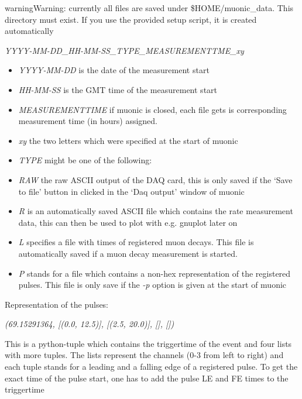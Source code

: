 \documentclass[letterpaper,10pt,english]{sphinxmanual}
\begin{document}
\begin{notice}{warning}{Warning:}
currently all files are saved under \$HOME/muonic\_data. This directory must exist. If you use the provided setup script, it is created automatically
\end{notice}

\emph{YYYY-MM-DD\_HH-MM-SS\_TYPE\_MEASUREMENTTME\_xy}
\begin{itemize}
\item {} 
\emph{YYYY-MM-DD} is the date of the measurement start

\item {} 
\emph{HH-MM-SS} is the GMT time of the measurement start

\item {} 
\emph{MEASUREMENTTIME} if muonic is closed, each file gets is corresponding measurement time (in hours) assigned.

\item {} 
\emph{xy} the two letters which were specified at the start of muonic

\item {} 
\emph{TYPE} might be one of the following:

\end{itemize}
\begin{itemize}
\item {} 
\emph{RAW} the raw ASCII output of the DAQ card, this is only saved if the `Save to file' button in clicked in the `Daq output' window of muonic

\item {} 
\emph{R} is an automatically saved ASCII file which contains the rate measurement data, this can then be used to plot with e.g. gnuplot later on

\item {} 
\emph{L} specifies a file with times of registered muon decays. This file is automatically saved if a muon decay measurement is started.

\item {} 
\emph{P} stands for a file which contains a non-hex representation of the registered pulses. This file is only save if the \emph{-p} option is given at the start of muonic

\end{itemize}

Representation of the pulses:

\emph{(69.15291364, {[}(0.0, 12.5){]}, {[}(2.5, 20.0){]}, {[}{]}, {[}{]})}

This is a python-tuple which contains the triggertime of the event and four lists with more tuples. The lists represent the channels (0-3 from left to right) and each tuple stands for a leading and a falling edge of a registered pulse. To get the exact time of the pulse start, one has to add the pulse LE and FE times to the triggertime
\end{document}
